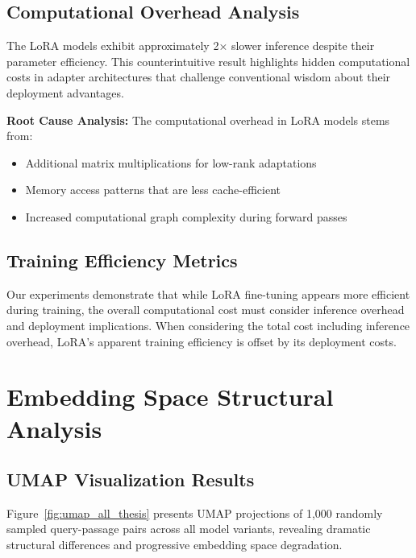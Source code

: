 \subsection{Computational Overhead Analysis}

The LoRA models exhibit approximately 2× slower inference despite their parameter efficiency. This counterintuitive result highlights hidden computational costs in adapter architectures that challenge conventional wisdom about their deployment advantages.

\textbf{Root Cause Analysis:} The computational overhead in LoRA models stems from:
\begin{itemize}
\item Additional matrix multiplications for low-rank adaptations
\item Memory access patterns that are less cache-efficient
\item Increased computational graph complexity during forward passes
\end{itemize}

\subsection{Training Efficiency Metrics}

Our experiments demonstrate that while LoRA fine-tuning appears more efficient during training, the overall computational cost must consider inference overhead and deployment implications. When considering the total cost including inference overhead, LoRA's apparent training efficiency is offset by its deployment costs.

\section{Embedding Space Structural Analysis}

\subsection{UMAP Visualization Results}

Figure~\ref{fig:umap_all_thesis} presents UMAP projections of 1,000 randomly sampled query-passage pairs across all model variants, revealing dramatic structural differences and progressive embedding space degradation.

